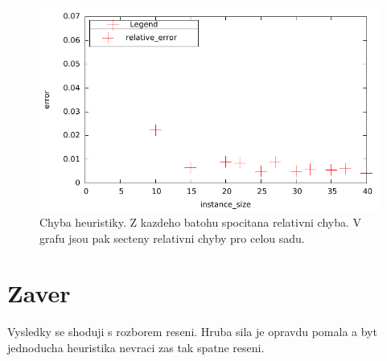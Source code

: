 \documentclass[12pt,a4paper]{article}
\begin{document}
\begin{figure}[H]
	\caption{Chyba heuristiky. Z kazdeho batohu spocitana relativni chyba. V grafu jsou pak secteny relativni chyby pro celou sadu.}
	\includegraphics{./err_h.png}
\end{figure}

\section{Zaver}
Vysledky se shoduji s rozborem reseni. Hruba sila je opravdu pomala a byt jednoducha heuristika nevraci zas tak spatne reseni.
\end{document}
